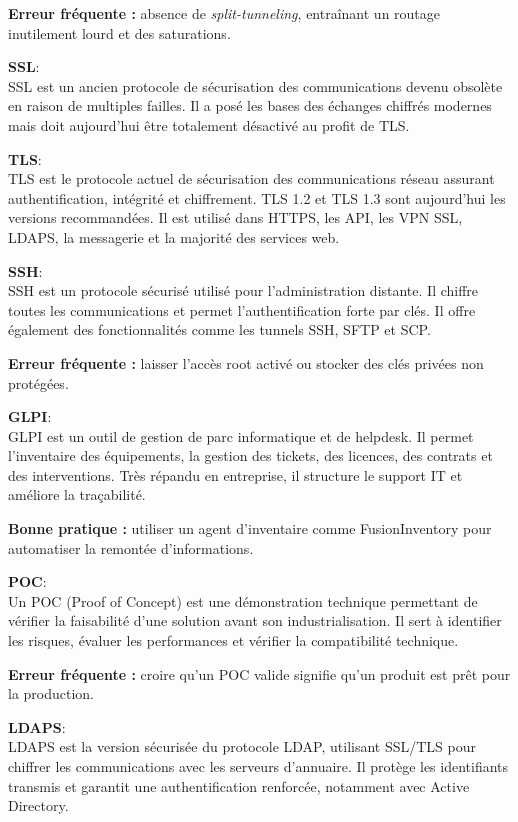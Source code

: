 \textbf{Erreur fréquente :} absence de \textit{split-tunneling}, entraînant un routage inutilement lourd et des saturations.

\medskip
\noindent \textbf{SSL}:\\
SSL est un ancien protocole de sécurisation des communications devenu obsolète en raison de multiples failles. Il a posé les bases des échanges chiffrés modernes mais doit aujourd’hui être totalement désactivé au profit de TLS.

\medskip
\noindent \textbf{TLS}:\\
TLS est le protocole actuel de sécurisation des communications réseau assurant authentification, intégrité et chiffrement. TLS 1.2 et TLS 1.3 sont aujourd’hui les versions recommandées. Il est utilisé dans HTTPS, les API, les VPN SSL, LDAPS, la messagerie et la majorité des services web.

\medskip
\noindent \textbf{SSH}:\\
SSH est un protocole sécurisé utilisé pour l’administration distante. Il chiffre toutes les communications et permet l’authentification forte par clés. Il offre également des fonctionnalités comme les tunnels SSH, SFTP et SCP.

\textbf{Erreur fréquente :} laisser l'accès root activé ou stocker des clés privées non protégées.

\medskip
\noindent \textbf{GLPI}:\\
GLPI est un outil de gestion de parc informatique et de helpdesk. Il permet l’inventaire des équipements, la gestion des tickets, des licences, des contrats et des interventions. Très répandu en entreprise, il structure le support IT et améliore la traçabilité.

\textbf{Bonne pratique :} utiliser un agent d'inventaire comme FusionInventory pour automatiser la remontée d’informations.

\medskip
\noindent \textbf{POC}:\\
Un POC (Proof of Concept) est une démonstration technique permettant de vérifier la faisabilité d’une solution avant son industrialisation. Il sert à identifier les risques, évaluer les performances et vérifier la compatibilité technique.

\textbf{Erreur fréquente :} croire qu’un POC valide signifie qu’un produit est prêt pour la production.

\medskip
\noindent \textbf{LDAPS}:\\
LDAPS est la version sécurisée du protocole LDAP, utilisant SSL/TLS pour chiffrer les communications avec les serveurs d’annuaire. Il protège les identifiants transmis et garantit une authentification renforcée, notamment avec Active Directory.

